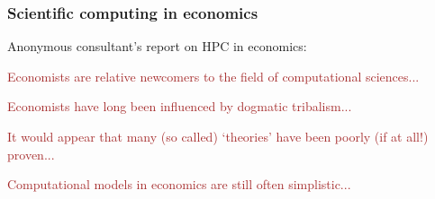 \documentclass[
    xcolor={svgnames,dvipsnames},
    hyperref={colorlinks, citecolor=DeepPink4, linkcolor=DarkRed, urlcolor=DarkBlue}
    ]{beamer}  %
\newcommand{\brown}[1]{\textcolor{Brown}{\sf #1}}
\newcommand{\1}{\mathbbm 1}
\begin{document}
\begin{frame}
    \frametitle{Scientific computing in economics}

    Anonymous consultant's report on HPC in economics:

    \vspace{0.3em}
    \vspace{0.3em}
    \vspace{0.3em}
    \pause

    \brown{Economists are relative newcomers to the
        field of computational sciences...}

            \vspace{0.3em}
    \brown{Economists have long been influenced by dogmatic tribalism...}

            \vspace{0.3em}
    \brown{It would appear that many (so called) `theories' have been poorly
    (if at all!) proven...}

            \vspace{0.3em}
    \brown{Computational models in economics are still often simplistic...}

\end{frame}


\end{document}
